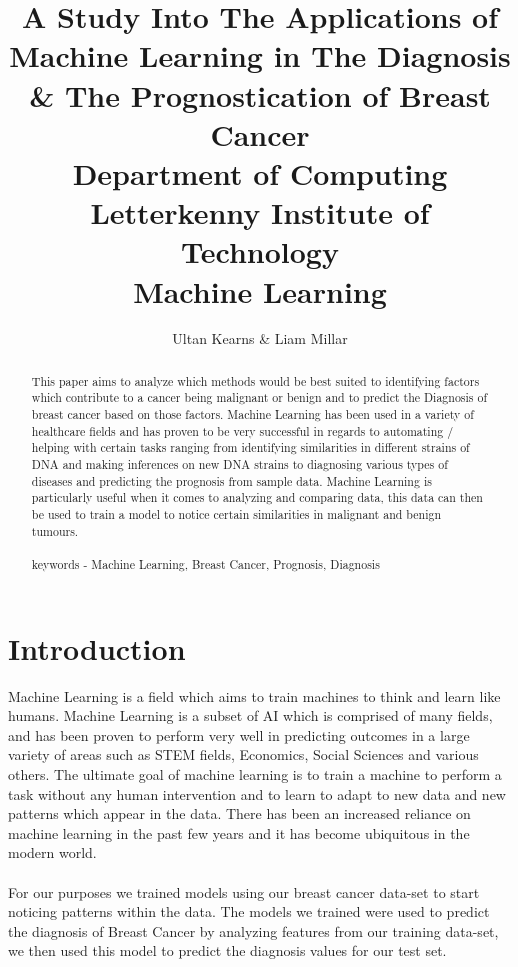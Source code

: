 \documentclass[conference]{IEEEtran}
\begin{document}
 
\title{
A Study Into The Applications of Machine Learning in The Diagnosis \& The Prognostication of Breast Cancer\\
\vspace{5mm}
\large Department of Computing \\
\vspace{3mm} 
\large Letterkenny Institute of Technology \\
\vspace{3mm} 
\large Machine Learning
}
\vspace{3mm}  
\author{Ultan Kearns \& Liam Millar}
\maketitle
\begin{abstract}
    This paper aims to analyze which methods would be best suited to identifying factors which contribute to a cancer being malignant or benign and to predict the Diagnosis of breast cancer based on those factors. Machine Learning has been used in a variety of healthcare fields and has proven to be very successful in regards to automating / helping with certain tasks ranging from identifying similarities in different strains of DNA and making inferences on new DNA strains to diagnosing various types of diseases and predicting the prognosis from sample data.  Machine Learning is particularly useful when it comes to analyzing and comparing data, this data can then be used to train a model to notice certain similarities in malignant and benign tumours.  
    \\
    \\
    keywords - Machine Learning, Breast Cancer, Prognosis, Diagnosis
\end{abstract}

\section{Introduction}
Machine Learning is a field which aims to train machines to think and learn like humans. Machine Learning is a subset of AI which is comprised of many fields, and has been proven to perform very well in predicting outcomes in a large variety of areas such as STEM fields, Economics, Social Sciences and various others.  The ultimate goal of machine learning is to train a machine to perform a task without any human intervention and to learn to adapt to new data and new patterns which appear in the data.  There has been an increased reliance on machine learning in the past few years and it has become ubiquitous in the modern world.\\\\ For our purposes we trained models using our breast cancer data-set to start noticing patterns within the data. The models we trained were used to predict the diagnosis of Breast Cancer by analyzing features from our training data-set, we then used this model to predict the diagnosis values for our test set.  
\end{document}
